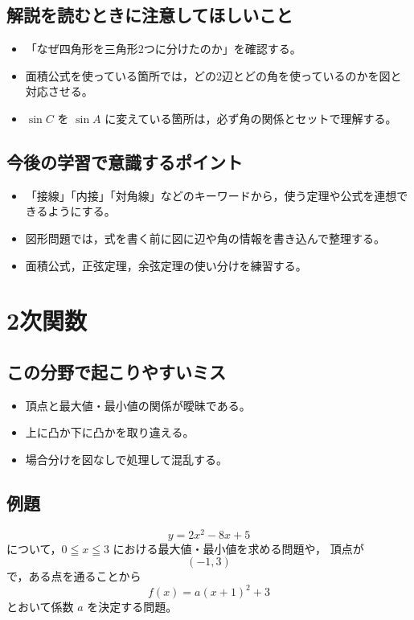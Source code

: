 \subsection*{解説を読むときに注意してほしいこと}
\begin{itemize}
  \item 「なぜ四角形を三角形2つに分けたのか」を確認する。
  \item 面積公式を使っている箇所では，どの2辺とどの角を使っているのかを図と対応させる。
  \item $\sin C$ を $\sin A$ に変えている箇所は，必ず角の関係とセットで理解する。
\end{itemize}

\subsection*{今後の学習で意識するポイント}
\begin{itemize}
  \item 「接線」「内接」「対角線」などのキーワードから，使う定理や公式を連想できるようにする。
  \item 図形問題では，式を書く前に図に辺や角の情報を書き込んで整理する。
  \item 面積公式，正弦定理，余弦定理の使い分けを練習する。
\end{itemize}

\bigskip

\section*{2次関数}

\subsection*{この分野で起こりやすいミス}
\begin{itemize}
  \item 頂点と最大値・最小値の関係が曖昧である。
  \item 上に凸か下に凸かを取り違える。
  \item 場合分けを図なしで処理して混乱する。
\end{itemize}

\subsection*{例題}
\[
y=2x^2-8x+5
\]
について，$0\leqq x\leqq 3$ における最大値・最小値を求める問題や，  
頂点が
\[
(-1,3)
\]
で，ある点を通ることから
\[
f(x)=a(x+1)^2+3
\]
とおいて係数 $a$ を決定する問題。

